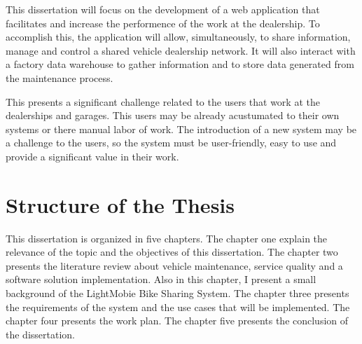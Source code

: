 This dissertation will focus on the development of a web application that facilitates and increase the performence of the work at the dealership.
To accomplish this, the application will allow, simultaneously, to share information, manage and control a shared vehicle dealership network.
It will also interact with a factory data warehouse to gather information and to store data generated from the maintenance process. 

This presents a significant challenge related to the users that work at the dealerships and garages. 
This users may be already acustumated to their own systems or there manual labor of work.  
The introduction of a new system may be a challenge to the users, so the system must be user-friendly, easy to use and provide a significant value in their work.

\section{Structure of the Thesis}

This dissertation is organized in five chapters. The chapter one explain the relevance of the topic and the objectives of this dissertation.
The chapter two presents the literature review about vehicle maintenance, service quality and a software solution implementation. 
Also in this chapter, I present a small background of the LightMobie Bike Sharing System.
The chapter three presents the requirements of the system and the use cases that will be implemented.
The chapter four presents the work plan.
The chapter five presents the conclusion of the dissertation. 

